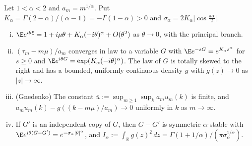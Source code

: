 \begin{lemma}\label{lem:stable}
Let $1<\alpha<2$ and $a_m=m^{1/\alpha}$. Put
$K_\alpha=\Gamma(2-\alpha)/(\alpha-1)=-\Gamma(1-\alpha)>0$ and
$\sigma_\alpha=2K_\alpha\lvert\cos\frac{\pi\alpha}2\rvert$.
\begin{enumerate}[(i)]
\item $\E e^{i\theta\xi}=1+i\mu\theta+K_\alpha(-i\theta)^\alpha+O(\theta^2)$
as $\theta\to0$, with the principal branch.
\item $(\tau_m-m\mu)/a_m$ converges in law to a variable $G$ with
$\E e^{-sG}=e^{K_\alpha s^\alpha}$ for $s\ge0$ and
$\E e^{i\theta G}=\exp(K_\alpha(-i\theta)^\alpha)$. The law of $G$ is totally
skewed to the right and has a bounded, uniformly continuous density $g$ with
$g(z)\to0$ as $\lvert z\rvert\to\infty$.
\item (Gnedenko) The constant $\bar u:=\sup_{m\ge1}\sup_ka_mu_m(k)$ is
finite, and $a_mu_m(k)-g((k-m\mu)/a_m)\to0$ uniformly in $k$ as
$m\to\infty$.
\item If $G'$ is an independent copy of $G$, then $G-G'$ is symmetric
$\alpha$-stable with $\E e^{i\theta(G-G')}=e^{-\sigma_\alpha\lvert
\theta\rvert^\alpha}$, and
$I_\alpha:=\int_{\mathbb R}g(z)^2\,dz=\Gamma(1+1/\alpha)/(\pi\sigma_\alpha^{1/\alpha})$.
\end{enumerate}
\end{lemma}

